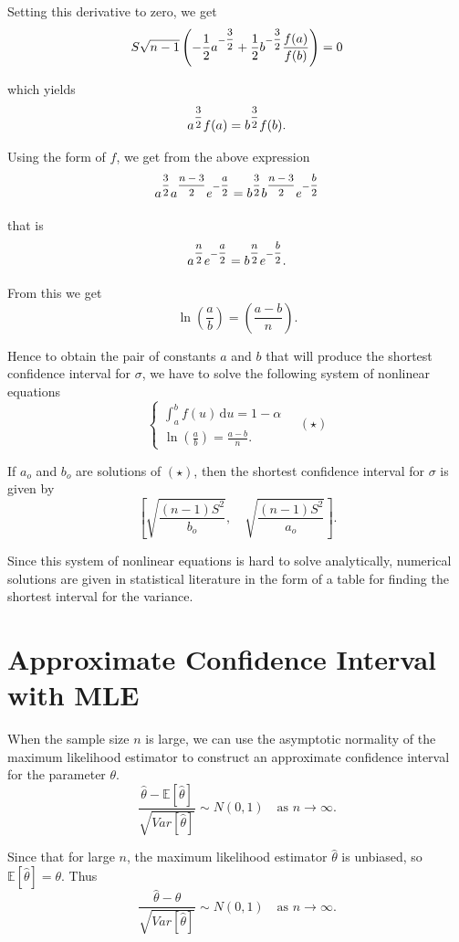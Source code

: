 Setting this derivative to zero, we get
\[
S\sqrt{n-1}\left(-\frac{1}{2}a^{-\mfrac{3}{2}} + \frac{1}{2}b^{-\mfrac{3}{2}}\frac{f(a)}{f(b)}\right) = 0
\]

which yields
\[
a^{\mfrac{3}{2}}f(a) = b^{\mfrac{3}{2}}f(b).
\]

Using the form of $f$, we get from the above expression
\[
a^{\mfrac{3}{2}}a^{\mfrac{n-3}{2}}e^{-\mfrac{a}{2}} = b^{\mfrac{3}{2}}b^{\mfrac{n-3}{2}}e^{-\mfrac{b}{2}}
\]

that is
\[
a^{\mfrac{n}{2}}e^{-\mfrac{a}{2}} = b^{\mfrac{n}{2}}e^{-\mfrac{b}{2}}.
\]

From this we get
\[
\ln\left(\frac{a}{b}\right) = \left(\frac{a-b}{n}\right).
\]

Hence to obtain the pair of constants $a$ and $b$ that will produce the shortest
confidence interval for $\sigma$, we have to solve the following system of nonlinear
equations
\[
\begin{cases}
\displaystyle\int_a^b f(u)\,\mathrm{d}u = 1 - \alpha\\[1em]
\displaystyle\ln\left(\frac{a}{b}\right) = \frac{a-b}{n}.
\end{cases}
\quad (\star)
\]

If $a_o$ and $b_o$ are solutions of $(\star)$, then the shortest confidence interval for $\sigma$
is given by
\[
\left[\sqrt{\frac{(n-1)S^2}{b_o}},\quad \sqrt{\frac{(n-1)S^2}{a_o}}\right].
\]

Since this system of nonlinear equations is hard to solve analytically, numerical solutions are given in statistical literature in the form of a table for
finding the shortest interval for the variance.

\section{Approximate Confidence Interval with MLE}

When the sample size $n$ is large, we can use the asymptotic normality of the maximum likelihood estimator to construct an approximate confidence interval for the parameter $\theta$. 
\begin{equation}
    \frac{\widehat{\theta} - \mathbb{E}[\widehat{\theta}]}{\sqrt{Var[\widehat{\theta}]}} \sim N(0,1) \quad \text{as } n \to \infty.
\end{equation}

Since that for large $n$, the maximum likelihood estimator $\widehat{\theta}$ is unbiased, so $\mathbb{E}[\widehat{\theta}] = \theta$. Thus 
\begin{equation}
    \frac{\widehat{\theta} - \theta}{\sqrt{Var[\widehat{\theta}]}} \sim N(0,1) \quad \text{as } n \to \infty.
\end{equation}


